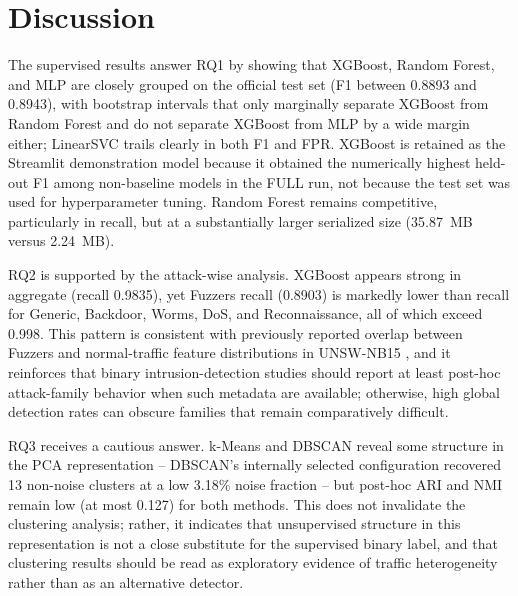 \documentclass[conference]{IEEEtran}
\begin{document}
\begin{table}[htbp]
\caption{Efficiency and artifact-size summary. Sizes are reported in MB unless noted otherwise.}
\label{tab:efficiency}
\centering
{}
\end{table}

\FloatBarrier

\section{Discussion}
The supervised results answer RQ1 by showing that XGBoost, Random Forest, and MLP are closely grouped on the official test set (F1 between 0.8893 and 0.8943), with bootstrap intervals that only marginally separate XGBoost from Random Forest and do not separate XGBoost from MLP by a wide margin either; LinearSVC trails clearly in both F1 and FPR. XGBoost is retained as the Streamlit demonstration model because it obtained the numerically highest held-out F1 among non-baseline models in the FULL run, not because the test set was used for hyperparameter tuning. Random Forest remains competitive, particularly in recall, but at a substantially larger serialized size (35.87~MB versus 2.24~MB).

RQ2 is supported by the attack-wise analysis. XGBoost appears strong in aggregate (recall 0.9835), yet Fuzzers recall (0.8903) is markedly lower than recall for Generic, Backdoor, Worms, DoS, and Reconnaissance, all of which exceed 0.998. This pattern is consistent with previously reported overlap between Fuzzers and normal-traffic feature distributions in UNSW-NB15 \cite{zoghi2024overlap}, and it reinforces that binary intrusion-detection studies should report at least post-hoc attack-family behavior when such metadata are available; otherwise, high global detection rates can obscure families that remain comparatively difficult.

RQ3 receives a cautious answer. k-Means and DBSCAN reveal some structure in the PCA representation -- DBSCAN's internally selected configuration recovered 13 non-noise clusters at a low 3.18\% noise fraction -- but post-hoc ARI and NMI remain low (at most 0.127) for both methods. This does not invalidate the clustering analysis; rather, it indicates that unsupervised structure in this representation is not a close substitute for the supervised binary label, and that clustering results should be read as exploratory evidence of traffic heterogeneity rather than as an alternative detector.
\end{document}
